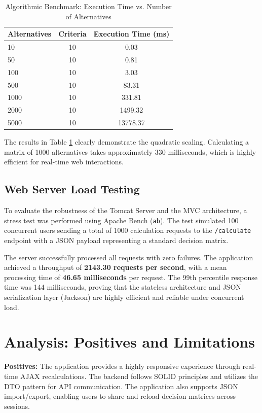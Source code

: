 \documentclass[12pt,a4paper,oneside]{report}
\begin{document}
\begin{table}[H]
\caption{Algorithmic Benchmark: Execution Time vs. Number of Alternatives}
\label{tab:benchmark_algo}
\centering
\begin{tabular}{lcc}
\toprule
\textbf{Alternatives} & \textbf{Criteria} & \textbf{Execution Time (ms)} \\
\midrule
10 & 10 & 0.03 \\
50 & 10 & 0.81 \\
100 & 10 & 3.03 \\
500 & 10 & 83.31 \\
1000 & 10 & 331.81 \\
2000 & 10 & 1499.32 \\
5000 & 10 & 13778.37 \\
\bottomrule
\end{tabular}
\end{table}

The results in Table \ref{tab:benchmark_algo} clearly demonstrate the quadratic scaling. Calculating a matrix of 1000 alternatives takes approximately 330 milliseconds, which is highly efficient for real-time web interactions.

\subsection{Web Server Load Testing}
To evaluate the robustness of the Tomcat Server and the MVC architecture, a stress test was performed using Apache Bench (\texttt{ab}). The test simulated 100 concurrent users sending a total of 1000 calculation requests to the \texttt{/calculate} endpoint with a JSON payload representing a standard decision matrix.

The server successfully processed all requests with zero failures. The application achieved a throughput of \textbf{2143.30 requests per second}, with a mean processing time of \textbf{46.65 milliseconds} per request. The 99th percentile response time was 144 milliseconds, proving that the stateless architecture and JSON serialization layer (Jackson) are highly efficient and reliable under concurrent load.

\section{Analysis: Positives and Limitations}
\textbf{Positives:} The application provides a highly responsive experience through real-time AJAX recalculations. The backend follows SOLID principles and utilizes the DTO pattern for API communication. The application also supports JSON import/export, enabling users to share and reload decision matrices across sessions.
\end{document}
